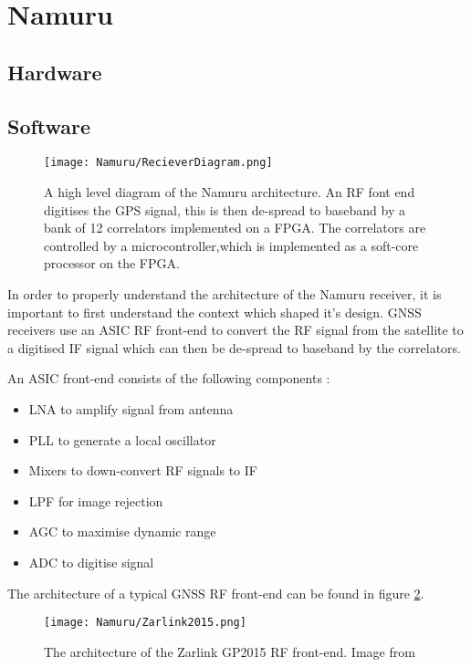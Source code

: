 \section{Namuru}

\subsection{Hardware}

\subsection{Software}

\begin{figure}[!htb] 
    \centering
    \texttt{[image: Namuru/RecieverDiagram.png]} 
    \caption{A high level diagram of the Namuru architecture. An RF font end digitises the GPS signal, this is then de-spread to baseband by a bank of 12 correlators implemented on a FPGA. The correlators are controlled by a microcontroller,which is implemented as a soft-core processor on the FPGA.}
    \label{fig:RecieverDiagram}
\end{figure}

In order to properly understand the architecture of the Namuru receiver, it is important to first understand the context which shaped it's design. \ac{GNSS} receivers use an \ac{ASIC} RF front-end to convert the \ac{RF} signal from the satellite to a digitised \ac{IF} signal which can then be de-spread to baseband by the correlators. 

An \ac{ASIC} front-end consists of the following components \cite{GlennonPresentation}: 

\begin{itemize}
\item{\ac{LNA} to amplify signal from antenna}
\item{\ac{PLL} to generate a local oscillator}
\item{Mixers to down-convert RF signals to IF}
\item{\ac{LPF} for image rejection}
\item{\ac{AGC} to maximise dynamic range}
\item{\ac{ADC} to digitise signal}
\end{itemize}

The architecture of a typical \ac{GNSS} \ac{RF} front-end can be found in figure \ref{fig:Zarlink2015}.  

\begin{figure}[!htb] 
    \centering
    \texttt{[image: Namuru/Zarlink2015.png]} 
    \caption{The architecture of the Zarlink GP2015 \ac{RF} front-end. Image from \cite{Zarlink2015}}
    \label{fig:Zarlink2015}
\end{figure}

